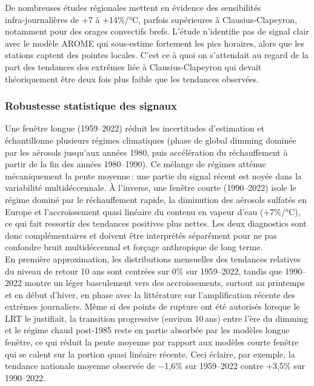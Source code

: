 \documentclass[
  article,
  nofooter,
  noheadings]{jss}
\begin{document}
De nombreuses études régionales mettent en évidence des sensibilités
infra‑journalières de +7 à +14\%/°C, parfois supérieures à
Clausius‑Clapeyron, notamment pour des orages convectifs brefs. L'étude
n'identifie pas de signal clair avec le modèle AROME qui sous‑estime
fortement les pics horaires, alors que les stations captent des pointes
locales. C'est ce à quoi on s'attendait au regard de la part des
tendances des extrêmes liée à Clausius-Clapeyron qui devait
théoriquement être deux fois plus faible que les tendances observées.

\subsubsection{Robustesse statistique des
signaux}\label{robustesse-statistique-des-signaux}

Une fenêtre longue (1959--2022) réduit les incertitudes d'estimation et
échantillonne plusieurs régimes climatiques (phase de global dimming
dominée par les aérosols jusqu'aux années 1980, puis accélération du
réchauffement à partir de la fin des années 1980--1990). Ce mélange de
régimes atténue mécaniquement la pente moyenne\,: une partie du signal
récent est noyée dans la variabilité multidéccennale. À l'inverse, une
fenêtre courte (1990--2022) isole le régime dominé par le réchauffement
rapide, la diminution des aérosols sulfatés en Europe et l'accroissement
quasi linéaire du contenu en vapeur d'eau (+7\%/°C), ce qui fait
ressortir des tendances positives plus nettes. Les deux diagnostics sont
donc complémentaires et doivent être interprétés séparément pour ne pas
confondre bruit multidéccennal et forçage anthropique de long terme.\\

En première approximation, les distributions mensuelles des tendances
relatives du niveau de retour 10 ans sont centrées sur 0\% sur
1959--2022, tandis que 1990--2022 montre un léger basculement vers des
accroissements, surtout au printemps et en début d'hiver, en phase avec
la littérature sur l'amplification récente des extrêmes journaliers.
Même si des points de rupture ont été autorisés lorsque le LRT le
justifiait, la transition progressive (environ 10\,ans) entre l'ère du
dimming et le régime chaud post‑1985 reste en partie absorbée par les
modèles longue fenêtre, ce qui réduit la pente moyenne par rapport aux
modèles courte fenêtre qui se calent sur la portion quasi linéaire
récente. Ceci éclaire, par exemple, la tendance nationale moyenne
observée de −1,6\% sur 1959--2022 contre +3,5\% sur 1990--2022.\\
\end{document}
